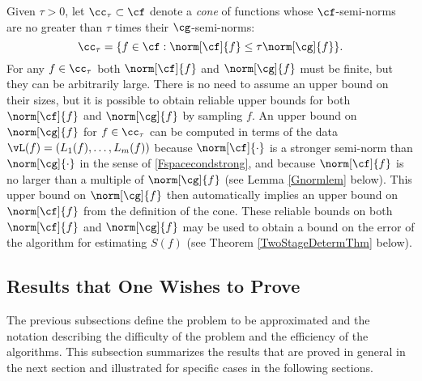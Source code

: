 \documentclass[final]{elsarticle}
\theoremstyle{definition}
\theoremstyle{remark}
\begin{document}
Given $\tau>0$, let $\cc_{\tau} \subset \cf$ denote a \emph{cone} of functions whose $\cf$-semi-norms are no greater than $\tau$ times their $\cg$-semi-norms:
\begin{equation} \label{conedef}
\cc_{\tau}=\{f \in \cf : \norm[\cf]{f} \le \tau \norm[\cg]{f} \}.
\end{equation}
For any $f \in \cc_{\tau}$ both $\norm[\cf]{f}$ and $\norm[\cg]{f}$ must be finite, but they can be arbitrarily large.  There is no need to assume an upper bound on their sizes, but it is possible to obtain reliable upper bounds for both $\norm[\cf]{f}$ and $\norm[\cg]{f}$ by sampling $f$.  An upper bound on $\norm[\cg]{f}$ for $f \in \cc_{\tau}$ can be computed in terms of the data $\vL(f)=(L_1(f), \ldots, L_m(f))$ because $\norm[\cf]{\cdot}$ is a stronger semi-norm than $\norm[\cg]{\cdot}$ in the sense of \eqref{Fspacecondstrong}, and because $\norm[\cf]{f}$ is no larger than a multiple of $\norm[\cg]{f}$ (see Lemma \ref{Gnormlem} below). This upper bound on $\norm[\cg]{f}$ then automatically implies an upper bound on $\norm[\cf]{f}$ from the definition of the cone. These reliable bounds on both $\norm[\cf]{f}$ and $\norm[\cg]{f}$ may be used to obtain a bound on the error of the algorithm for estimating $S(f)$  (see Theorem \ref{TwoStageDetermThm} below).

\subsection{Results that One Wishes to Prove}  The previous subsections define the problem to be approximated and the notation describing the difficulty of the problem and the efficiency of the algorithms.  This subsection summarizes the results that are proved in general in the next section and illustrated for specific cases in the following sections.
\end{document}
